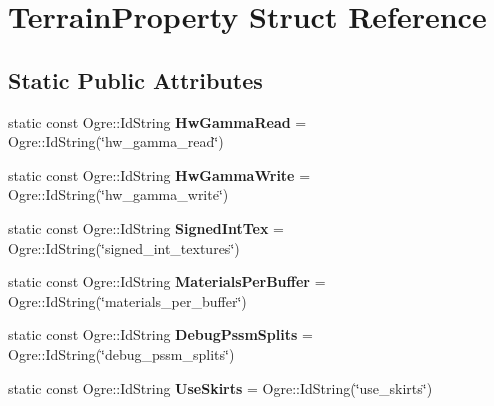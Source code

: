 \hypertarget{struct_terrain_property}{}\section{Terrain\+Property Struct Reference}
\label{struct_terrain_property}
\subsection*{Static Public Attributes}
\begin{DoxyCompactItemize}
\item 
\mbox{\label{struct_terrain_property_a22095cddb10ad9588af60aac13e91822}} 
static const Ogre\+::\+Id\+String {\bfseries Hw\+Gamma\+Read} = Ogre\+::\+Id\+String(\char`\"{}hw\+\_\+gamma\+\_\+read\char`\"{})
\item 
\mbox{\label{struct_terrain_property_a522f35e9ece5841d0725970b60d1c109}} 
static const Ogre\+::\+Id\+String {\bfseries Hw\+Gamma\+Write} = Ogre\+::\+Id\+String(\char`\"{}hw\+\_\+gamma\+\_\+write\char`\"{})
\item 
\mbox{\label{struct_terrain_property_acf24b762c211bd602ec09a42c99d89c6}} 
static const Ogre\+::\+Id\+String {\bfseries Signed\+Int\+Tex} = Ogre\+::\+Id\+String(\char`\"{}signed\+\_\+int\+\_\+textures\char`\"{})
\item 
\mbox{\label{struct_terrain_property_af3ca6b4b14896385b7f8469d3319b190}} 
static const Ogre\+::\+Id\+String {\bfseries Materials\+Per\+Buffer} = Ogre\+::\+Id\+String(\char`\"{}materials\+\_\+per\+\_\+buffer\char`\"{})
\item 
\mbox{\label{struct_terrain_property_a72ae12a8d7e970352dce12c85ec347e4}} 
static const Ogre\+::\+Id\+String {\bfseries Debug\+Pssm\+Splits} = Ogre\+::\+Id\+String(\char`\"{}debug\+\_\+pssm\+\_\+splits\char`\"{})
\item 
\mbox{\label{struct_terrain_property_a7e1dd987e92da8748a20dfee723f1323}} 
static const Ogre\+::\+Id\+String {\bfseries Use\+Skirts} = Ogre\+::\+Id\+String(\char`\"{}use\+\_\+skirts\char`\"{})
\item 
\mbox{\label{struct_terrain_property_ade95dfaa0276195af0c8578d32fe674a}} 

\end{DoxyCompactItemize}
